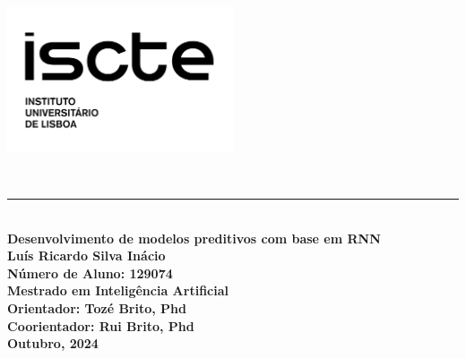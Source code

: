 \begin{titlepage}
	\begin{flushleft}
		\begin{minipage}{\textwidth}
			\vspace{1cm} %
			\includegraphics[width=0.5\textwidth]{iscte.png}
		\end{minipage}\\[1cm]
	\end{flushleft}
	\noindent
	\textcolor{barraazul}{\rule{\textwidth}{1mm}} %
	\\[0.5cm]
	{\Huge \textbf{\centering Desenvolvimento de modelos preditivos com base em RNN}}\\[1.5cm]
	\noindent
	\textbf{Luís Ricardo Silva Inácio}\\
	\textbf{Número de Aluno: 129074}\\[2cm]
	\textbf{Mestrado em Inteligência Artificial}\\[1.5cm]
	\textbf{Orientador: Tozé Brito, Phd}\\
	\textbf{Coorientador: Rui Brito, Phd}\\[3cm]
	\textbf{Outubro, 2024}
\end{titlepage}
